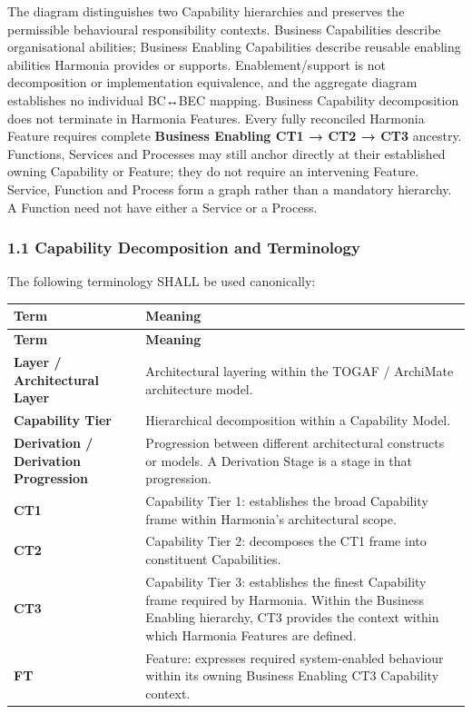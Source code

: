 The diagram distinguishes two Capability hierarchies and preserves the permissible behavioural responsibility contexts. Business Capabilities describe organisational abilities; Business Enabling Capabilities describe reusable enabling abilities Harmonia provides or supports. Enablement/\allowbreak{}support is not decomposition or implementation equivalence, and the aggregate diagram establishes no individual BC↔BEC mapping. Business Capability decomposition does not terminate in Harmonia Features. Every fully reconciled Harmonia Feature requires complete \textbf{Business Enabling CT1 → CT2 → CT3} ancestry. Functions, Services and Processes may still anchor directly at their established owning Capability or Feature; they do not require an intervening Feature. Service, Function and Process form a graph rather than a mandatory hierarchy. A Function need not have either a Service or a Process.

\label{rad:metamodel:33}
\subsubsection*{1.1 Capability Decomposition and Terminology}
\label{rad:metamodel:35}

The following terminology SHALL be used canonically:

\label{rad:metamodel:37}
\begingroup\small\setlength{\TableWidth}{\dimexpr\linewidth-4\tabcolsep-3\arrayrulewidth\relax}
\begin{longtable}{|>{\raggedright\arraybackslash}p{0.35\TableWidth}|>{\raggedright\arraybackslash}p{0.65\TableWidth}|}
\hline\rowcolor{TableHead}\textbf{Term} & \textbf{Meaning}\\\hline\endfirsthead
\hline\rowcolor{TableHead}\textbf{Term} & \textbf{Meaning}\\\hline\endhead
\hline\endfoot
\textbf{Layer /\allowbreak{} Architectural Layer} & Architectural layering within the TOGAF /\allowbreak{} ArchiMate architecture model.\\\hline
\textbf{Capability Tier} & Hierarchical decomposition within a Capability Model.\\\hline
\textbf{Derivation /\allowbreak{} Derivation Progression} & Progression between different architectural constructs or models. A Derivation Stage is a stage in that progression.\\\hline
\textbf{CT1} & Capability Tier 1: establishes the broad Capability frame within Harmonia's architectural scope.\\\hline
\textbf{CT2} & Capability Tier 2: decomposes the CT1 frame into constituent Capabilities.\\\hline
\textbf{CT3} & Capability Tier 3: establishes the finest Capability frame required by Harmonia. Within the Business Enabling hierarchy, CT3 provides the context within which Harmonia Features are defined.\\\hline
\textbf{FT} & Feature: expresses required system-enabled behaviour within its owning Business Enabling CT3 Capability context.\\\hline
\end{longtable}\endgroup
{}\label{rad:metamodel:47}

